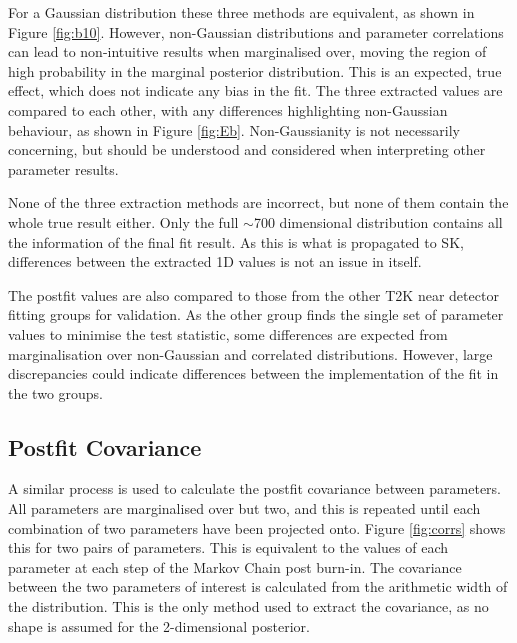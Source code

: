 For a Gaussian distribution these three methods are equivalent, as shown in Figure \ref{fig:b10}. However, non-Gaussian distributions and parameter correlations can lead to non-intuitive results when marginalised over, moving the region of high probability in the marginal posterior distribution. This is an expected, true effect, which does not indicate any bias in the fit. The three extracted values are compared to each other, with any differences highlighting non-Gaussian behaviour, as shown in Figure \ref{fig:Eb}. Non-Gaussianity is not necessarily concerning, but should be understood and considered when interpreting other parameter results. 

None of the three extraction methods are incorrect, but none of them contain the whole true result either. Only the full $\sim$700 dimensional distribution contains all the information of the final fit result. As this is what is propagated to SK, differences between the extracted 1D values is not an issue in itself. 

The postfit values are also compared to those from the other T2K near detector fitting groups for validation. As the other group finds the single set of parameter values to minimise the test statistic, some differences are expected from marginalisation over non-Gaussian and correlated distributions. However, large discrepancies could indicate differences between the implementation of the fit in the two groups.

\subsection{Postfit Covariance}\label{sec:postcov}

A similar process is used to calculate the postfit covariance between parameters. All parameters are marginalised over but two, and this is repeated until each combination of two parameters have been projected onto. Figure \ref{fig:corrs} shows this for two pairs of parameters. This is equivalent to the values of each parameter at each step of the Markov Chain post burn-in. The covariance between the two parameters of interest is calculated from the arithmetic width of the distribution. This is the only method used to extract the covariance, as no shape is assumed for the 2-dimensional posterior.

